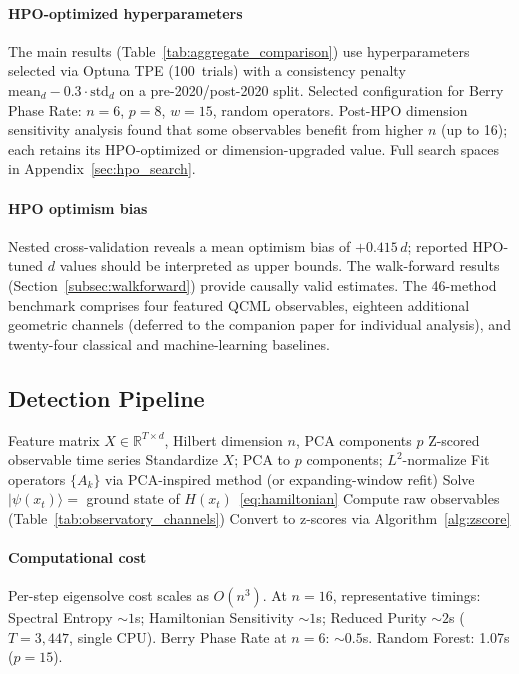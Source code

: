 \documentclass[3p]{elsarticle}
\newcommand{\ket}[1]{|#1\rangle}
\newcommand{\R}{\mathbb{R}}
\begin{document}
\paragraph{HPO-optimized hyperparameters}
The main results (Table~\ref{tab:aggregate_comparison}) use
hyperparameters selected via Optuna TPE (100~trials) with a
consistency penalty
$\text{mean}_d - 0.3 \cdot \text{std}_d$ on a pre-2020/post-2020 split.
Selected configuration for Berry Phase Rate: $n{=}6$, $p{=}8$,
$w{=}15$, random operators.  Post-HPO dimension sensitivity analysis
found that some observables benefit from higher $n$ (up to 16);
each retains its HPO-optimized or dimension-upgraded value.
Full search spaces in Appendix~\ref{sec:hpo_search}.

\paragraph{HPO optimism bias}
Nested cross-validation reveals a mean optimism bias of $+0.415\,d$;
reported HPO-tuned $d$ values should be interpreted as upper bounds.
The walk-forward results (Section~\ref{subsec:walkforward})
provide causally valid estimates.
The 46-method benchmark comprises four featured QCML observables,
eighteen additional geometric channels (deferred to the companion
paper for individual analysis), and twenty-four classical and
machine-learning baselines.

\subsection{Detection Pipeline}\label{subsec:pipeline}

\begin{algorithm}[htb]
\caption{QCML Geometric Regime Detection}\label{alg:detection}
\begin{algorithmic}[1]
\Require Feature matrix $X \in \R^{T \times d}$, Hilbert dimension
  $n$, PCA components $p$
\Ensure Z-scored observable time series
\State Standardize $X$; PCA to $p$ components; $L^2$-normalize
\State Fit operators $\{A_k\}$ via PCA-inspired method
  (or expanding-window refit)
  \State Solve $\ket{\psi(x_t)} = $ ground state of
    $H(x_t)$~\eqref{eq:hamiltonian}
  \State Compute raw observables (Table~\ref{tab:observatory_channels})
\EndFor
\State Convert to z-scores via Algorithm~\ref{alg:zscore}
\end{algorithmic}
\end{algorithm}

\paragraph{Computational cost}
Per-step eigensolve cost scales as $O(n^3)$.  At $n = 16$,
representative timings: Spectral Entropy ${\sim}1$s; Hamiltonian
Sensitivity ${\sim}1$s; Reduced Purity ${\sim}2$s ($T = 3{,}447$,
single CPU).  Berry Phase Rate at $n = 6$: ${\sim}0.5$s.
Random Forest: 1.07s ($p = 15$).
\end{document}
